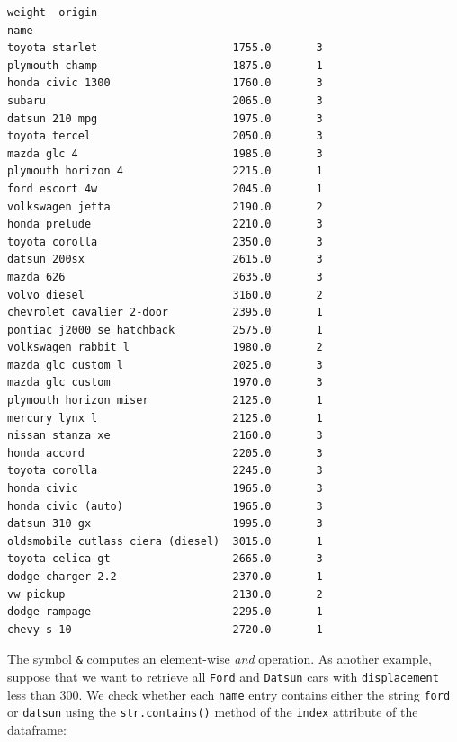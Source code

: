 \documentclass[11pt]{article}
\makeatletter
\newcommand{\boxspacing}{\kern\kvtcb@left@rule\kern\kvtcb@boxsep}
\newcommand{\prompt}[4]{
        {\ttfamily\llap{{\color{#2}[#3]:\hspace{3pt}#4}}\vspace{-\baselineskip}}
    }
\makeatother
\begin{document}
            \begin{tcolorbox}[breakable, size=fbox, boxrule=.5pt, pad at break*=1mm, opacityfill=0]
\prompt{Out}{outcolor}{95}{\boxspacing}
\begin{Verbatim}[commandchars=\\\{\}]
                                   weight  origin
name
toyota starlet                     1755.0       3
plymouth champ                     1875.0       1
honda civic 1300                   1760.0       3
subaru                             2065.0       3
datsun 210 mpg                     1975.0       3
toyota tercel                      2050.0       3
mazda glc 4                        1985.0       3
plymouth horizon 4                 2215.0       1
ford escort 4w                     2045.0       1
volkswagen jetta                   2190.0       2
honda prelude                      2210.0       3
toyota corolla                     2350.0       3
datsun 200sx                       2615.0       3
mazda 626                          2635.0       3
volvo diesel                       3160.0       2
chevrolet cavalier 2-door          2395.0       1
pontiac j2000 se hatchback         2575.0       1
volkswagen rabbit l                1980.0       2
mazda glc custom l                 2025.0       3
mazda glc custom                   1970.0       3
plymouth horizon miser             2125.0       1
mercury lynx l                     2125.0       1
nissan stanza xe                   2160.0       3
honda accord                       2205.0       3
toyota corolla                     2245.0       3
honda civic                        1965.0       3
honda civic (auto)                 1965.0       3
datsun 310 gx                      1995.0       3
oldsmobile cutlass ciera (diesel)  3015.0       1
toyota celica gt                   2665.0       3
dodge charger 2.2                  2370.0       1
vw pickup                          2130.0       2
dodge rampage                      2295.0       1
chevy s-10                         2720.0       1
\end{Verbatim}
\end{tcolorbox}
        
    The symbol \texttt{\&} computes an element-wise \emph{and} operation. As
another example, suppose that we want to retrieve all \texttt{Ford} and
\texttt{Datsun} cars with \texttt{displacement} less than 300. We check
whether each \texttt{name} entry contains either the string
\texttt{ford} or \texttt{datsun} using the \texttt{str.contains()}
method of the \texttt{index} attribute of the dataframe:
\end{document}
